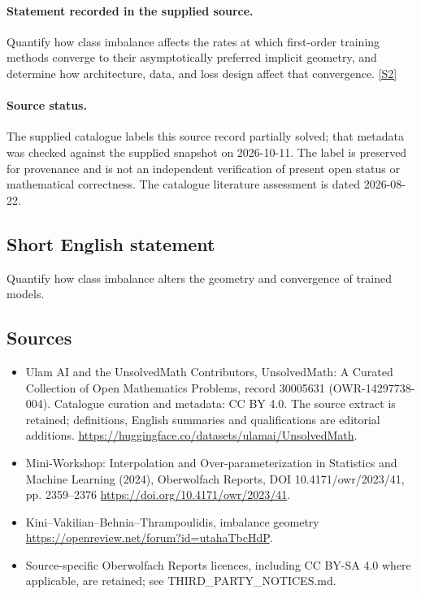 \documentclass[11pt]{article}
\begin{document}
\paragraph{Statement recorded in the supplied source.}
Quantify how class imbalance affects the rates at which first-order training methods converge to their asymptotically preferred implicit geometry, and determine how architecture, data, and loss design affect that convergence. \href{https://doi.org/10.4171/owr/2023/41}{[S2]}
\paragraph{Source status.}
The supplied catalogue labels this source record partially solved; that metadata was checked against the supplied snapshot on 2026-10-11. The label is preserved for provenance and is not an independent verification of present open status or mathematical correctness. The catalogue literature assessment is dated 2026-08-22.
\subsection{Short English statement}
Quantify how class imbalance alters the geometry and convergence of trained models.
\subsection{Sources}
\begin{itemize}
\item[S1] Ulam AI and the UnsolvedMath Contributors, UnsolvedMath: A Curated Collection of Open Mathematics Problems, record 30005631 (OWR-14297738-004). Catalogue curation and metadata: CC BY 4.0. The source extract is retained; definitions, English summaries and qualifications are editorial additions.
\url{https://huggingface.co/datasets/ulamai/UnsolvedMath}.
\item[S2] Mini-Workshop: Interpolation and Over-parameterization in Statistics and Machine Learning​ (2024), Oberwolfach Reports, DOI 10.4171/owr/2023/41, pp. 2359--2376
\url{https://doi.org/10.4171/owr/2023/41}.
\item[S3] Kini--Vakilian--Behnia--Thrampoulidis, imbalance geometry
\url{https://openreview.net/forum?id=utahaTbcHdP}.
\item Source-specific Oberwolfach Reports licences, including CC BY-SA 4.0 where applicable, are retained; see THIRD\_PARTY\_NOTICES.md.
\end{itemize}
\end{document}
